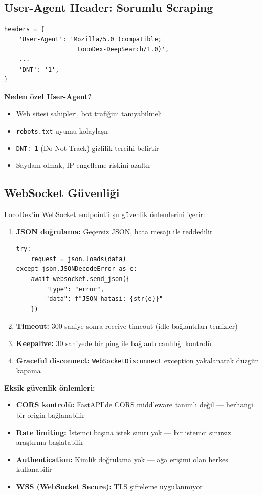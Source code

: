 \subsection{User-Agent Header: Sorumlu Scraping}

\begin{verbatim}
headers = {
    'User-Agent': 'Mozilla/5.0 (compatible;
                    LocoDex-DeepSearch/1.0)',
    ...
    'DNT': '1',
}
\end{verbatim}

\textbf{Neden \"{o}zel User-Agent?}
\begin{itemize}
  \item Web sitesi sahipleri, bot trafi\u{g}ini tan{\i}yabilmeli
  \item \texttt{robots.txt} uyumu kolayla\c{s}{\i}r
  \item \texttt{DNT: 1} (Do Not Track) gizlilik tercihi belirtir
  \item Saydam olmak, IP engelleme riskini azalt{\i}r
\end{itemize}

\subsection{WebSocket G\"{u}venli\u{g}i}

LocoDex'in WebSocket endpoint'i \c{s}u g\"{u}venlik \"{o}nlemlerini i\c{c}erir:

\begin{enumerate}
  \item \textbf{JSON do\u{g}rulama:} Ge\c{c}ersiz JSON, hata mesaj{\i} ile reddedilir
\begin{verbatim}
try:
    request = json.loads(data)
except json.JSONDecodeError as e:
    await websocket.send_json({
        "type": "error",
        "data": f"JSON hatasi: {str(e)}"
    })
\end{verbatim}

  \item \textbf{Timeout:} 300 saniye sonra receive timeout (idle ba\u{g}lant{\i}lar{\i} temizler)
  \item \textbf{Keepalive:} 30 saniyede bir ping ile ba\u{g}lant{\i} canl{\i}l{\i}\u{g}{\i} kontrol\"{u}
  \item \textbf{Graceful disconnect:} \texttt{WebSocketDisconnect} exception yakalanarak d\"{u}zg\"{u}n kapama
\end{enumerate}

\textbf{Eksik g\"{u}venlik \"{o}nlemleri:}
\begin{itemize}
  \item \textbf{CORS kontrol\"{u}:} FastAPI'de CORS middleware tan{\i}ml{\i} de\u{g}il --- herhangi bir origin ba\u{g}lanabilir
  \item \textbf{Rate limiting:} \.{I}stemci ba\c{s}{\i}na istek s{\i}n{\i}r{\i} yok --- bir istemci s{\i}n{\i}rs{\i}z ara\c{s}t{\i}rma ba\c{s}latabilir
  \item \textbf{Authentication:} Kimlik do\u{g}rulama yok --- a\u{g}a eri\c{s}imi olan herkes kullanabilir
  \item \textbf{WSS (WebSocket Secure):} TLS \c{s}ifreleme uygulanm{\i}yor
\end{itemize}


